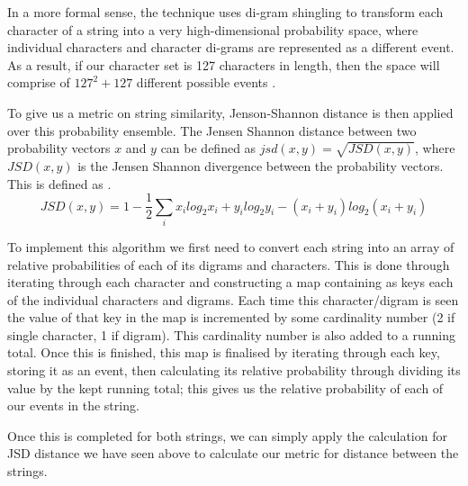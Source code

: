 \documentclass[a4paper,11pt]{article}
\begin{document}
In a more formal sense, the technique uses di-gram shingling to transform each character of a string into a very high-dimensional probability space, where individual characters and character di-grams are represented as a different event. As a result, if our character set is 127 characters in length, then the space will comprise of $127^2 + 127$ different possible events \citep{richardsPaper}.

To give us a metric on string similarity, Jenson-Shannon distance is then applied over this probability ensemble. The Jensen Shannon distance between two probability vectors $x$ and $y$ can be defined as $jsd(x,y)=\sqrt{JSD(x,y)}$, where $JSD(x,y)$ is the Jensen Shannon divergence between the probability vectors. This is defined as \citep{richardsPaper}.
\begin{equation}
    JSD(x,y) = 1 - \frac{1}{2} \sum_i x_ilog_2x_i + y_ilog_2y_i - (x_i + y_i)log_2(x_i + y_i)
\end{equation}

To implement this algorithm we first need to convert each string into an array of relative probabilities of each of its digrams and characters. This is done through iterating through each character and constructing a map containing as keys each of the individual characters and digrams. Each time this character/digram is seen the value of that key in the map is incremented by some cardinality number (2 if single character, 1 if digram). This cardinality number is also added to a running total. Once this is finished, this map is finalised by iterating through each key, storing it as an event, then calculating its relative probability through dividing its value by the kept running total; this gives us the relative probability of each of our events in the string.


Once this is completed for both strings, we can simply apply the calculation for JSD distance we have seen above to calculate our metric for distance between the strings.
\end{document}

